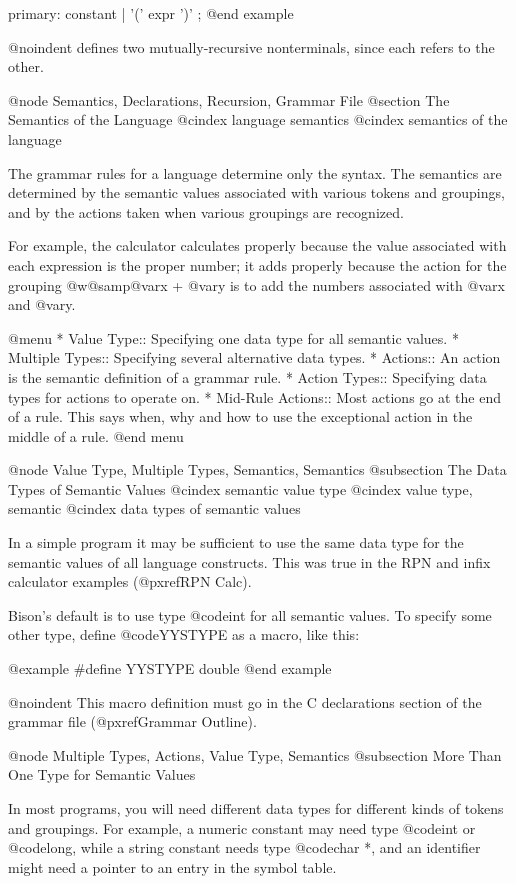 {{{{{{{{{{{{{{{{{{primary:  constant
        | '(' expr ')'
        ;
@end example

@noindent
defines two mutually-recursive nonterminals, since each refers to the
other.

@node Semantics, Declarations, Recursion, Grammar File
@section The Semantics of the Language
@cindex language semantics
@cindex semantics of the language

The grammar rules for a language determine only the syntax.  The semantics
are determined by the semantic values associated with various tokens and
groupings, and by the actions taken when various groupings are recognized.

For example, the calculator calculates properly because the value
associated with each expression is the proper number; it adds properly
because the action for the grouping @w{@samp{@var{x} + @var{y}}} is to add
the numbers associated with @var{x} and @var{y}.

@menu
* Value Type::       Specifying one data type for all semantic values.
* Multiple Types::   Specifying several alternative data types.
* Actions::          An action is the semantic definition of a grammar rule.
* Action Types::     Specifying data types for actions to operate on.
* Mid-Rule Actions:: Most actions go at the end of a rule.
                      This says when, why and how to use the exceptional
                      action in the middle of a rule.
@end menu

@node Value Type, Multiple Types, Semantics, Semantics
@subsection The Data Types of Semantic Values
@cindex semantic value type
@cindex value type, semantic
@cindex data types of semantic values

In a simple program it may be sufficient to use the same data type for
the semantic values of all language constructs.  This was true in the
RPN and infix calculator examples (@pxref{RPN Calc}).

Bison's default is to use type @code{int} for all semantic values.  To
specify some other type, define @code{YYSTYPE} as a macro, like this:

@example
#define YYSTYPE double
@end example

@noindent
This macro definition must go in the C declarations section of the grammar
file (@pxref{Grammar Outline}).

@node Multiple Types, Actions, Value Type, Semantics
@subsection More Than One Type for Semantic Values

In most programs, you will need different data types for different kinds
of tokens and groupings.  For example, a numeric constant may need type
@code{int} or @code{long}, while a string constant needs type @code{char *},
and an identifier might need a pointer to an entry in the symbol table.

}}}}}}}}}}}}}}}}}}
